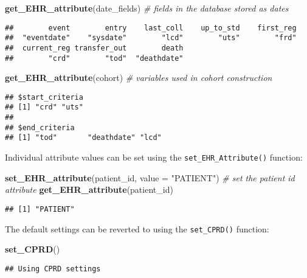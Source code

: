\documentclass[]{article}
\newenvironment{Shaded}{\begin{snugshade}}{\end{snugshade}}
\newcommand{\KeywordTok}[1]{\textcolor[rgb]{0.13,0.29,0.53}{\textbf{{#1}}}}
\newcommand{\DataTypeTok}[1]{\textcolor[rgb]{0.13,0.29,0.53}{{#1}}}
\newcommand{\StringTok}[1]{\textcolor[rgb]{0.31,0.60,0.02}{{#1}}}
\newcommand{\CommentTok}[1]{\textcolor[rgb]{0.56,0.35,0.01}{\textit{{#1}}}}
\newcommand{\NormalTok}[1]{{#1}}
\begin{document}
\begin{Shaded}
\begin{Highlighting}[]
\KeywordTok{get_EHR_attribute}\NormalTok{(date_fields) }\CommentTok{# fields in the database stored as dates}
\end{Highlighting}
\end{Shaded}

\begin{verbatim}
##        event        entry    last_coll    up_to_std    first_reg 
##  "eventdate"    "sysdate"        "lcd"        "uts"        "frd" 
##  current_reg transfer_out        death 
##        "crd"        "tod"  "deathdate"
\end{verbatim}

\begin{Shaded}
\begin{Highlighting}[]
\KeywordTok{get_EHR_attribute}\NormalTok{(cohort) }\CommentTok{# variables used in cohort construction}
\end{Highlighting}
\end{Shaded}

\begin{verbatim}
## $start_criteria
## [1] "crd" "uts"
## 
## $end_criteria
## [1] "tod"       "deathdate" "lcd"
\end{verbatim}

Individual attribute values can be set using the
\texttt{set\_EHR\_Attribute()} function:

\begin{Shaded}
\begin{Highlighting}[]
\KeywordTok{set_EHR_attribute}\NormalTok{(patient_id, }\DataTypeTok{value =} \StringTok{"PATIENT"}\NormalTok{) }\CommentTok{# set the patient id attribute}
\KeywordTok{get_EHR_attribute}\NormalTok{(patient_id)}
\end{Highlighting}
\end{Shaded}

\begin{verbatim}
## [1] "PATIENT"
\end{verbatim}

The default settings can be reverted to using the \texttt{set\_CPRD()}
function:

\begin{Shaded}
\begin{Highlighting}[]
\KeywordTok{set_CPRD}\NormalTok{()}
\end{Highlighting}
\end{Shaded}

\begin{verbatim}
## Using CPRD settings
\end{verbatim}
\end{document}
